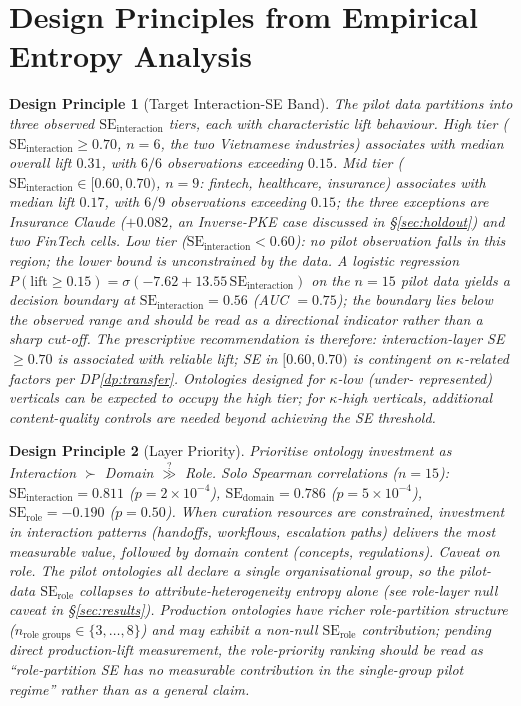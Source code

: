 \documentclass[11pt,a4paper]{article}
\newtheorem{designprinciple}{Design Principle}
\newcommand{\se}{\mathrm{SE}}
\newcommand{\serole}{\se_{\text{role}}}
\newcommand{\sedom}{\se_{\text{domain}}}
\newcommand{\seint}{\se_{\text{interaction}}}
\newcommand{\kapp}{\kappa}
\begin{document}
\section{Design Principles from Empirical Entropy Analysis}
\label{sec:principles}

\begin{designprinciple}[Target Interaction-SE Band]
\label{dp:target-band}
The pilot data partitions into three observed $\seint$ tiers, each
with characteristic lift behaviour. \emph{High tier} ($\seint \geq
0.70$, $n = 6$, the two Vietnamese industries) associates with median
overall lift $0.31$, with $6/6$ observations exceeding $0.15$.
\emph{Mid tier} ($\seint \in [0.60, 0.70)$, $n = 9$: fintech,
healthcare, insurance) associates with median lift $0.17$, with $6/9$
observations exceeding $0.15$; the three exceptions are Insurance
Claude ($+0.082$, an Inverse-PKE case discussed in
\S\ref{sec:holdout}) and two FinTech cells. \emph{Low tier}
($\seint < 0.60$): no pilot observation falls in this region; the
lower bound is unconstrained by the data. A logistic regression
$P(\text{lift} \geq 0.15) = \sigma(-7.62 + 13.55\,\seint)$ on the
$n=15$ pilot data yields a decision boundary at $\seint = 0.56$ (AUC
$= 0.75$); the boundary lies below the observed range and should be
read as a directional indicator rather than a sharp cut-off. The
prescriptive recommendation is therefore: \emph{interaction-layer SE
$\geq 0.70$ is associated with reliable lift; SE in $[0.60, 0.70)$
is contingent on $\kapp$-related factors per
DP\ref{dp:transfer}}. Ontologies designed for $\kapp$-low (under-%
represented) verticals can be expected to occupy the high tier; for
$\kapp$-high verticals, additional content-quality controls are
needed beyond achieving the SE threshold.
\end{designprinciple}

\begin{designprinciple}[Layer Priority]
\label{dp:layer-balance}
Prioritise ontology investment as Interaction $\succ$ Domain
$\stackrel{?}{\gg}$ Role. Solo Spearman correlations ($n = 15$):
$\seint = 0.811$ ($p = 2 \times 10^{-4}$), $\sedom = 0.786$
($p = 5 \times 10^{-4}$), $\serole = -0.190$ ($p = 0.50$). When
curation resources are constrained, investment in interaction patterns
(handoffs, workflows, escalation paths) delivers the most measurable
value, followed by domain content (concepts, regulations).
\emph{Caveat on role.} The pilot ontologies all declare a single
organisational group, so the pilot-data $\serole$ collapses to
attribute-heterogeneity entropy alone (see role-layer null caveat in
\S\ref{sec:results}). Production ontologies have richer
role-partition structure ($n_{\text{role groups}} \in \{3,\ldots,8\}$)
and may exhibit a non-null $\serole$ contribution; pending direct
production-lift measurement, the role-priority ranking should be read
as ``role-partition SE has no measurable contribution \emph{in the
single-group pilot regime}'' rather than as a general claim.
\end{designprinciple}
\end{document}
